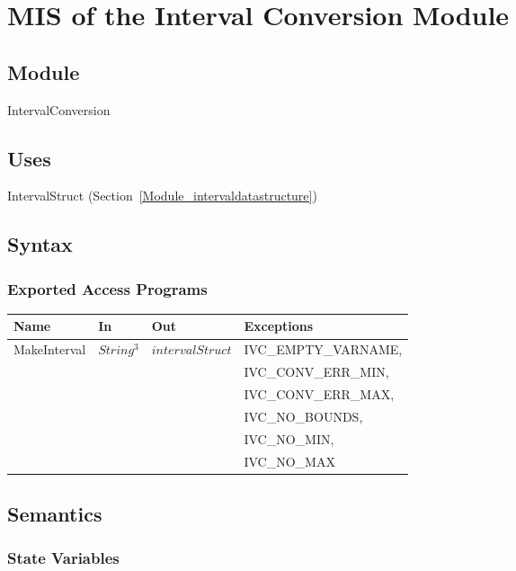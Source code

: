 \documentclass[12pt, titlepage]{article}
\begin{document}
\newpage

\section{MIS of the Interval Conversion Module} 
\label{Module_intervalconversion}

\subsection{Module}

IntervalConversion

\subsection{Uses}

IntervalStruct (Section~\ref{Module_intervaldatastructure})

\subsection{Syntax}

\subsubsection{Exported Access Programs}

\begin{center}
	\begin{tabular}{p{3cm} p{2.3cm} p{3cm} p{5cm}}
		\hline
		\textbf{Name} & \textbf{In} & \textbf{Out} & \textbf{Exceptions} \\
		\hline
		\multirow{6}{3cm}{MakeInterval} & \multirow{6}{2.3cm}{$String^3$} & 
		\multirow{6}{3cm}{$intervalStruct$} & IVC\_EMPTY\_VARNAME, \\
		& & & IVC\_CONV\_ERR\_MIN, \\
		& & & IVC\_CONV\_ERR\_MAX, \\
		& & & IVC\_NO\_BOUNDS, \\
		& & & IVC\_NO\_MIN, \\
		& & & IVC\_NO\_MAX\\
		\hline
	\end{tabular}
\end{center}

\subsection{Semantics}

\subsubsection{State Variables}
\end{document}
